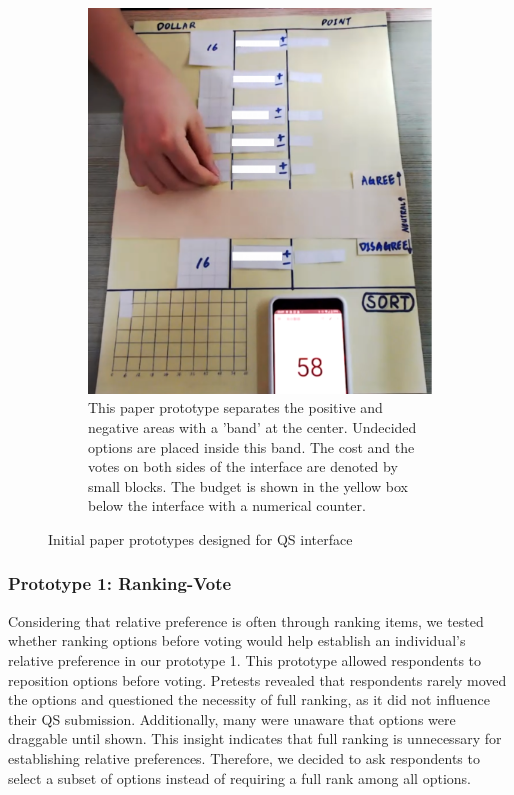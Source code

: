 \begin{figure}[H]
\begin{subfigure}[b]{0.42\textwidth}
        \includegraphics[width=\textwidth]{content/image/prototypes/1_paper_qv_single.png}
        \caption{This paper prototype separates the positive and negative areas with a 'band' at the center. Undecided options are placed inside this band. The cost and the votes on both sides of the interface are denoted by small blocks. The budget is shown in the yellow box below the interface with a numerical counter.}
        \label{fig:vertical_paper}
    \end{subfigure}
    \caption{Initial paper prototypes designed for QS interface}
    \label{fig:qv_paper}
\end{figure}

\subsubsection{Prototype 1: Ranking-Vote}
Considering that relative preference is often through ranking items, we tested whether ranking options before voting would help establish an individual's relative preference in our prototype 1. This prototype allowed respondents to reposition options before voting. Pretests revealed that respondents rarely moved the options and questioned the necessity of full ranking, as it did not influence their QS submission. Additionally, many were unaware that options were draggable until shown. This insight indicates that full ranking is unnecessary for establishing relative preferences. Therefore, we decided to ask respondents to select a subset of options instead of requiring a full rank among all options.

